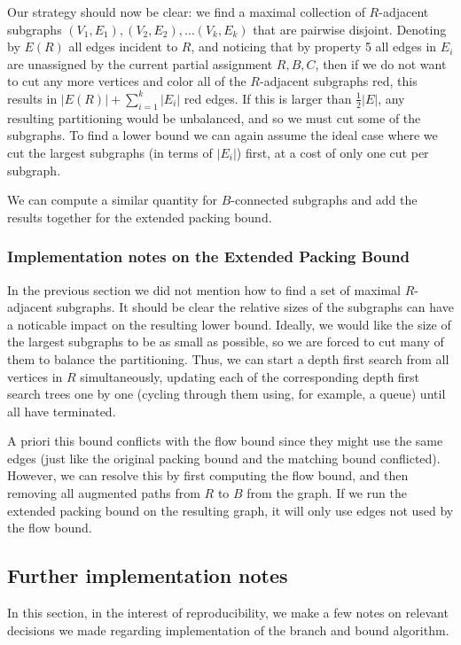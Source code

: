 	Our strategy should now be clear: we find a maximal collection of
	$R$-adjacent subgraphs $(V_1, E_1), (V_2, E_2), \dots (V_k, E_k)$ that
	are pairwise disjoint. Denoting by $E(R)$ all edges incident to $R$, and
	noticing that by property 5 all edges in $E_i$ are unassigned by
	the current
	partial assignment $R, B, C$,
	then if we do not want to cut any more vertices and color all of the
	$R$-adjacent subgraphs red, this results in
	$|E(R)| + \sum_{i=1}^k |E_i|$ red edges. If this is larger than
	$\frac{1}{2}|E|$, any resulting partitioning would be unbalanced, and so
	we must cut some of the subgraphs. To find a lower bound we can again
	assume the ideal case where we cut the largest subgraphs (in terms of
	$|E_i|$) first, at a cost of only one cut per subgraph.

	We can compute a similar quantity for $B$-connected subgraphs and add the
	results together for the extended packing bound.

	\subsubsection{Implementation notes on the Extended Packing Bound}
	In the previous section we did not mention how to find a set of maximal
	$R$-adjacent subgraphs. It should be clear the relative sizes of the
	subgraphs can have a noticable impact on the resulting lower bound.
	Ideally, we would like the size of the largest subgraphs to be as small
	as possible, so we are forced to cut many of them to balance the
	partitioning. Thus, we can start a depth first search from all vertices
	in $R$ simultaneously, updating each of the corresponding depth first
	search trees one by one (cycling through them using, for example, a
	queue) until all have terminated.

	A priori this bound conflicts with the flow bound since they might use
	the same edges (just like the original packing bound and the matching
	bound conflicted). However, we can resolve this by first computing the
	flow bound, and then removing all augmented paths from $R$ to $B$ from
	the graph. If we run the extended packing bound on the resulting graph,
	it will only use edges not used by the flow bound.	

	\subsection{Further implementation notes}

	In this section, in the interest of reproducibility, we make a few notes
	on relevant decisions we made regarding implementation of the branch and
	bound algorithm.

